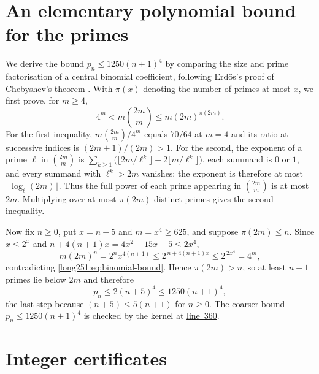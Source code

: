\appendix
\section{An elementary polynomial bound for the primes}\label{long251:app:prime-bound}

We derive the bound $p_n\le1250(n+1)^4$ by comparing the size and prime
factorisation of a central binomial coefficient, following
Erd\H{o}s's proof of Chebyshev's theorem
\cite[\S1, pp.~194--196]{erdos1932}.  With $\pi(x)$ denoting the number
of primes at most $x$, we first prove, for $m\ge4$,
\begin{equation}\label{long251:eq:binomial-bound}
 4^m<m\binom{2m}{m}\le m(2m)^{\pi(2m)} .
\end{equation}
For the first inequality, $m\binom{2m}{m}/4^{m}$ equals $70/64$ at $m=4$ and
its ratio at successive indices is $(2m+1)/(2m)>1$.  For the second, the
exponent of a prime $\ell$ in $\binom{2m}{m}$ is
$\sum_{k\ge1}\bigl(\lfloor2m/\ell^{k}\rfloor-2\lfloor m/\ell^{k}\rfloor\bigr)$,
each summand is $0$ or $1$, and every summand with $\ell^{k}>2m$ vanishes;
the exponent is therefore at most $\lfloor\log_\ell(2m)\rfloor$.
Thus the full power of each prime appearing in $\binom{2m}{m}$ is at most
$2m$.  Multiplying over at most $\pi(2m)$ distinct primes gives the second
inequality.

Now fix $n\ge0$, put $x=n+5$ and $m=x^4\ge625$, and suppose $\pi(2m)\le n$.
Since $x\le2^{x}$ and $n+4(n+1)x=4x^2-15x-5\le2x^4$,
\[
 m(2m)^{n}=2^{n}x^{4(n+1)}
 \le2^{\,n+4(n+1)x}\le2^{\,2x^4}=4^{m},
\]
contradicting \eqref{long251:eq:binomial-bound}.  Hence $\pi(2m)>n$, so at least $n+1$
primes lie below $2m$ and therefore
\[
 p_n\le2(n+5)^4\le1250(n+1)^4 ,
\]
the last step because $(n+5)\le5(n+1)$ for $n\ge0$.  The coarser bound
$p_n\le1250(n+1)^4$ is checked by the kernel at
\href{https://github.com/wcook04/plectis-erdos/blob/3d6d938d696fed0fb71dd55115a18a73738ff223/lean/ErdosProblems/Erdos251/PrimeGapDyadicTail.lean\#L360}{line~360}.

\section{Integer certificates}\label{long251:app:certificates}

